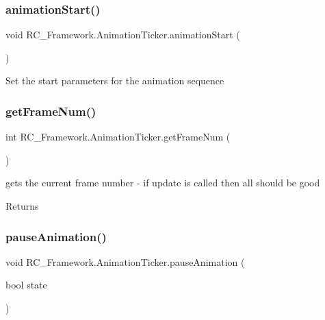 \subsubsection{\texorpdfstring{animation\+Start()}{animationStart()}}
{\footnotesize\ttfamily void R\+C\+\_\+\+Framework.\+Animation\+Ticker.\+animation\+Start (\begin{DoxyParamCaption}{ }\end{DoxyParamCaption})}



Set the start parameters for the animation sequence 

\mbox{\label{class_r_c___framework_1_1_animation_ticker_a5f122a2978abcd1ae930d22fbbf6e07e}} 
\subsubsection{\texorpdfstring{get\+Frame\+Num()}{getFrameNum()}}
{\footnotesize\ttfamily int R\+C\+\_\+\+Framework.\+Animation\+Ticker.\+get\+Frame\+Num (\begin{DoxyParamCaption}{ }\end{DoxyParamCaption})}



gets the current frame number -\/ if update is called then all should be good 

\begin{DoxyReturn}{Returns}

\end{DoxyReturn}
\mbox{\label{class_r_c___framework_1_1_animation_ticker_ad5efbd9a22b71acdb310cbf36bfc3ed4}} 
\subsubsection{\texorpdfstring{pause\+Animation()}{pauseAnimation()}}
{\footnotesize\ttfamily void R\+C\+\_\+\+Framework.\+Animation\+Ticker.\+pause\+Animation (\begin{DoxyParamCaption}\item[{bool}]{state }\end{DoxyParamCaption})}



